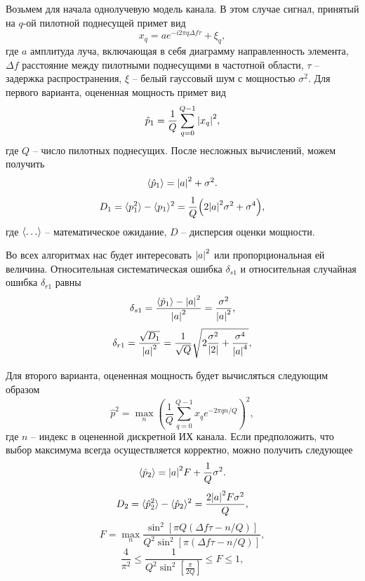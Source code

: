 Возьмем для начала однолучевую модель канала. В этом случае сигнал, принятый на $q$-ой пилотной поднесущей примет вид
\begin{equation}
    x_q = a e^{-i2\pi q\Delta f \tau} + \xi_q,
\end{equation}
где $a$ амплитуда луча, включающая в себя диаграмму направленность элемента, $\Delta f$ расстояние между пилотными поднесущими в частотной области, $\tau$ -- задержка распространения, $\xi$ -- белый гауссовый шум с мощностью $\sigma^2$.
Для первого варианта, оцененная мощность примет вид
\begin{equation}
    \hat p_1 = \frac{1}{Q} \sum\limits_{q = 0}^{Q - 1} \abs{x_q}^2,
\end{equation}
где $Q$ -- число пилотных поднесущих. После несложных вычислений, можем получить
\begin{equation}
    \langle \hat p_1 \rangle = \abs{a}^2 + \sigma^2.
\end{equation}
\begin{equation}
    D_1 = \langle p_1^2 \rangle - \langle p_1 \rangle^2 = \frac{1}{Q}\qty(2\abs{a}^2 \sigma^2 + \sigma^4),
\end{equation}
где $\mean{\dots}$ -- математическое ожидание, $D$ -- дисперсия оценки мощности.



Во всех алгоритмах нас будет интересовать $\abs{a}^2$ или пропорциональная ей величина.
Относительная систематическая ошибка $\delta_{s1}$ и относительная случайная ошибка $\delta_{r1}$ равны
\begin{equation}
    \delta_{s1} = \frac{\langle \hat p_1 \rangle - \abs{a}^2}{\abs{a}^2} = \frac{\sigma^2}{\abs{a}^2},
\end{equation}
\begin{equation}
    \delta_{r1} = \frac{\sqrt{D_1}}{\abs{a}^2} =
    \frac{1}{\sqrt{Q}} \sqrt{2 \frac{\sigma^2}{\abs{2}} +
        \frac{\sigma^4}{\abs{a}^4}},
\end{equation}

Для второго варианта, оцененная мощность будет вычисляться следующим образом
\begin{equation}
    \hat p^2 = \max_n(\frac{1}{Q} \sum\limits_{q=0}^{Q-1} x_q e^{-2 \pi q n /Q})^2,
\end{equation}
где $n$ -- индекс в оцененной дискретной ИХ канала. Если предположить, что выбор максимума всегда осуществляется корректно, можно получить следующее
\begin{equation}
    \langle \hat p_2 \rangle = \abs{a}^2 F + \frac{1}{Q}\sigma^2.
\end{equation}
\begin{equation}
    D_2 = \langle \hat p_2^2 \rangle - \langle \hat p_2 \rangle^2 = \frac{2\abs{a}^2 F \sigma^2}{Q},
\end{equation}
\begin{equation}
    F = \max_n \frac{\sin^2[\pi Q (\Delta f \tau - n/Q)]}{Q^2 \sin^2[\pi(\Delta f \tau - n/Q)]},
\end{equation}
\begin{equation}
    \frac{4}{\pi^2} \leq \frac{1}{Q^2 \sin^2[\frac{\pi}{2Q}]} \leq F \leq 1,
\end{equation}


